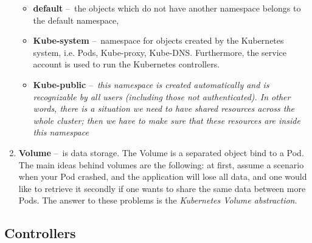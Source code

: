 \begin{enumerate}[itemsep=1mm, parsep=0pt]
        \begin{itemize}
            \item \textbf{default} \---\ the objects which do not have another namespace belongs to the default namespace,
            \item \textbf{Kube-system} \---\ namespace for objects created by the Kubernetes system, i.e. Pods, Kube-proxy, Kube-DNS. Furthermore, the service account is used to run the Kubernetes controllers.
            \item \textbf{Kube-public} \---\ \textit{this namespace is created automatically and is recognizable by all users (including those not authenticated). In other words, there is a situation we need to have shared resources across the whole cluster; then we have to make sure that these resources are inside this namespace} \cite{namespaceTypes}
        \end{itemize}
    
    \item \textbf{Volume} \---\ is data storage. The Volume is a separated object bind to a Pod. The main ideas behind volumes are the following: at first, assume a scenario when your Pod crashed, and the application will lose all data, and one would like to retrieve it secondly if one wants to share the same data between more Pods. The answer to these problems is the \emph{Kubernetes Volume abstraction}.
\end{enumerate}

\subsection{Controllers}

